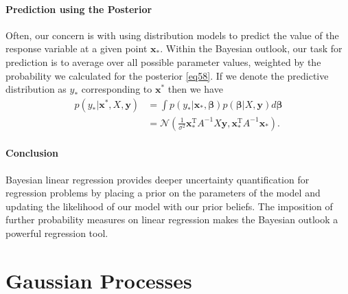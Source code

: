 \documentclass[10pt,a4paper]{article}
\newcommand{\Beta}{\boldsymbol\beta}
\numberwithin{equation}{section}
\theoremstyle{plain}
\theoremstyle{definition}
\theoremstyle{own}
\begin{document}
\subsection{Prediction using the Posterior}
Often, our concern is with using distribution models to predict the value of the response variable at a given point $\mathbf{x}_*$. Within the Bayesian outlook, our task for prediction is to average over all possible parameter values, weighted by the probability we calculated for the posterior \ref{eq58}. If we denote the predictive distribution as $y_*$ corresponding to $\mathbf{x}^*$ then we have
\begin{align}
p(y_*| \mathbf{x}^*, X, \mathbf{y}) & = \int p(y_*|\mathbf{x}_*, \Beta)p(\Beta|X, \mathbf{y}) d \Beta \\
 & = \mathcal{N}(\frac{1}{\sigma^2}\mathbf{x}_*^{\text{T}}A^{-1}X\mathbf{y}, \mathbf{x}_*^{\text{T}}A^{-1}\mathbf{x}_*).
\end{align}
\subsection{Conclusion}
Bayesian linear regression provides deeper uncertainty quantification for regression problems by placing a prior on the parameters of the model and updating the likelihood of our model with our prior beliefs. The imposition of further probability measures on linear regression makes the Bayesian outlook a powerful regression tool.
\pagebreak
\part{Gaussian Processes}
\end{document}
